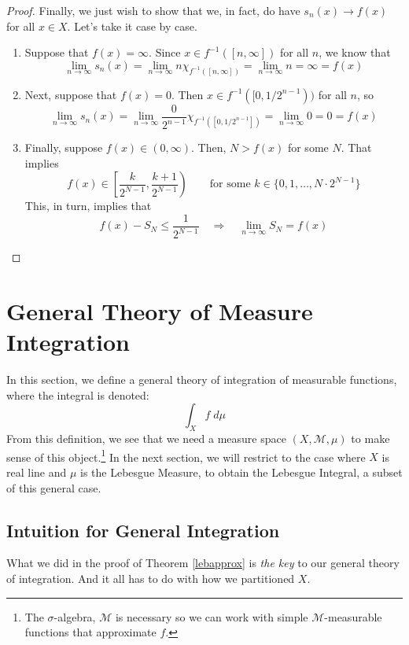 \documentclass[12pt]{article}
\theoremstyle{plain}
\theoremstyle{definition}
\theoremstyle{remark}
\begin{document}
\begin{proof}
Finally, we just wish to show that we, in fact, do have $s_n(x)\rightarrow f(x)$ for all $x\in X$. Let's take it case by case.
\begin{enumerate}
\item Suppose that $f(x)=\infty$. Since $x\in f^{-1}([n,\infty])$ for all $n$, we know that 
\[
    \lim_{n\rightarrow\infty} s_n(x) = \lim_{n\rightarrow\infty}
    n\chi_{f^{-1}([n,\infty])} = \lim_{n\rightarrow\infty}
    n = \infty = f(x)
\]
\item Next, suppose that $f(x) = 0$. Then $x\in f^{-1}([0,1/2^{n-1}))$ for all $n$, so 
\[
    \lim_{n\rightarrow\infty} s_n(x) = \lim_{n\rightarrow\infty}
    \frac{0}{2^{n-1}}\chi_{f^{-1}([0,1/2^{n-1}])} = 
    \lim_{n\rightarrow\infty} 0 = 0 = f(x)
\]
\item Finally, suppose $f(x)\in(0,\infty)$. Then, $N>f(x)$ for some $N$. That implies 
\[ 
    f(x) \in \left[\frac{k}{2^{N-1}}, \frac{k+1}{2^{N-1}}\right)
        \qquad
    \text{for some $k\in\{0,1,\ldots,N\cdot 2^{N-1}\}$} 
\]
This, in turn, implies that
\[
    f(x) - S_N \leq \frac{1}{2^{N-1}}
    \quad \Rightarrow\quad
    \lim_{n\rightarrow\infty}  S_N  =
    f(x)
\]
\end{enumerate}
\end{proof}


\newpage
\section{General Theory of Measure Integration}

In this section, we define a general theory of integration of measurable functions, where the integral is denoted:
\[
    \int_X f \; d\mu 
\]
From this definition, we see that we need a measure space $(X,\mathscr{M},\mu)$ to make sense of this object.\footnote{The $\sigma$-algebra, $\mathscr{M}$ is necessary so we can work with simple $\mathscr{M}$-measurable functions that approximate $f$.} In the next section, we will restrict to the case where $X$ is real line and $\mu$ is the Lebesgue Measure, to obtain the Lebesgue Integral, a subset of this general case.

\subsection{Intuition for General Integration}

What we did in the proof of Theorem \ref{lebapprox} is \emph{the key} to our general theory of integration.  And it all has to do with how we partitioned $X$.
\end{document}
